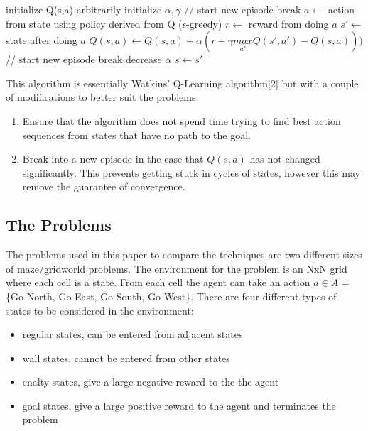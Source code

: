 \documentclass[a4paper,10pt]{article}
\begin{document}
\begin{algorithmic}[H]
\scriptsize
\ttfamily
\STATE initialize Q(s,a) arbitrarily
\STATE initialize $\alpha, \gamma$
		\STATE // start new episode
		\STATE break
		\ENDIF
		\STATE $a \leftarrow $ action from state using policy derived from Q ($\epsilon$-greedy)
			\STATE $r \leftarrow $ reward from doing $a$
			\STATE $s' \leftarrow $ state after doing $a$
			\STATE $Q(s,a) \leftarrow Q(s,a) + \alpha(r + \gamma \underset{a'}{max}Q(s',a') - Q(s,a)))$
				\STATE // start new episode
				\STATE break
			\ENDIF
			\STATE decrease $\alpha$
			\STATE $ s \leftarrow s'$
			\ENDWHILE

		\ENDFOR
\ENDFOR
\end{algorithmic}

This algorithm is essentially Watkins' Q-Learning algorithm[2] but with a couple of modifications to better suit the problems. 
\begin{enumerate}
\item Ensure that the algorithm does not spend time trying to find best action sequences from states that have no path to the goal.
\item Break into a new episode in the case that $Q(s,a)$ has not changed significantly. This prevents getting stuck in cycles of states, however this may remove the guarantee of convergence.
\end{enumerate}

\subsection{The Problems}
The problems used in this paper to compare the techniques are two different sizes of maze/gridworld problems. The environment for the problem is an NxN grid where each cell is a state. From each cell the agent can take an action $ a \in A $ = \{Go North, Go East, Go South, Go West\}. There are four different types of states to be considered in the environment: 

\begin{itemize}
\item regular states, can be entered from adjacent states
\item wall states, cannot be entered from other states
\item enalty states, give a large negative reward to the the agent
\item goal states, give a large positive reward to the agent and terminates the problem
\end{itemize}
\end{document}
